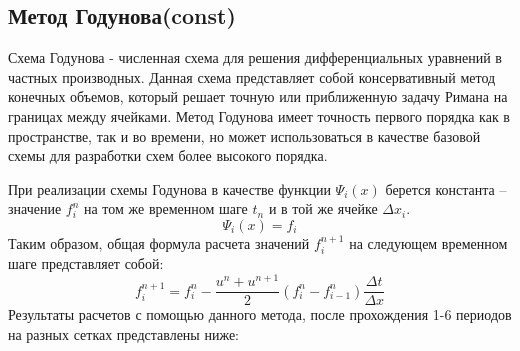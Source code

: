 \documentclass[12pt,a4paper]{article}
\begin{document}
\subsection{Метод Годунова(const)}
Схема Годунова - численная схема для решения дифференциальных уравнений в частных производных. Данная схема представляет собой консервативный метод конечных объемов, который решает точную или приближенную задачу Римана на границах между ячейками. Метод Годунова имеет точность первого порядка как в пространстве, так и во времени, но может использоваться в качестве базовой схемы для разработки схем более высокого порядка.

При реализации схемы Годунова в качестве функции $\Psi_i(x)$ берется константа – значение $f_i^n$ на том же временном шаге $t_n$ и в той же ячейке $\Delta x_i$.
\[
\Psi_i(x)=f_i
\]
Таким образом, общая формула расчета значений $f_i^{n+1}$ на следующем временном шаге представляет собой:
\[
f_i^{n+1}=f_i^n-\frac{u^n+u^{n+1}}{2}(f_i^n-f_{i-1}^n)\frac{\Delta t}{\Delta x}
\]
Результаты расчетов с помощью данного метода, после прохождения 1-6 периодов на разных сетках представлены ниже:
\\
\end{document}
